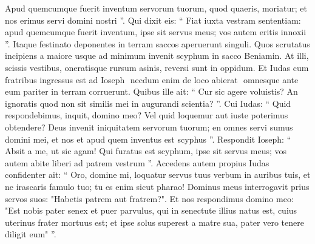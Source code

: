 \begin{biblechapter}
\begin{biblechapter}
\begin{biblechapter}
\begin{biblechapter}
\begin{biblechapter}
\begin{biblechapter}
\begin{biblechapter}
\begin{biblechapter}
\begin{biblechapter}
\begin{biblechapter}
\begin{biblechapter}
\begin{biblechapter}
\begin{biblechapter}
\begin{biblechapter}
\begin{biblechapter}
\begin{biblechapter}
\begin{biblechapter}
\begin{biblechapter}
\begin{biblechapter}
\begin{biblechapter}
\begin{biblechapter}
\begin{biblechapter}
\begin{biblechapter}
\begin{biblechapter}
\begin{biblechapter}
\begin{biblechapter}
\begin{biblechapter}
\begin{biblechapter}
\begin{biblechapter}
\begin{biblechapter}
\begin{biblechapter}
\begin{biblechapter}
\begin{biblechapter}
\begin{biblechapter}
\begin{biblechapter}
\begin{biblechapter}
\begin{biblechapter}
\begin{biblechapter}
\begin{biblechapter}
\begin{biblechapter}
\begin{biblechapter}
\begin{biblechapter}
\begin{biblechapter}
\begin{biblechapter}
\verse Apud quemcumque fuerit inventum servorum tuorum, quod quaeris, moriatur; et nos erimus servi domini nostri ”.
 \verse Qui dixit eis: “ Fiat iuxta vestram sententiam: apud quemcumque fuerit inventum, ipse sit servus meus; vos autem eritis innoxii ”. 
\verse Itaque festinato deponentes in terram saccos aperuerunt singuli. 
\verse Quos scrutatus incipiens a maiore usque ad minimum invenit scyphum in sacco Beniamin.
 \verse At illi, scissis vestibus, oneratisque rursum asinis, reversi sunt in oppidum. 
\verse Et Iudas cum fratribus ingressus est ad Ioseph ­ necdum enim de loco abierat ­ omnesque ante eum pariter in terram corruerunt. 
\verse Quibus ille ait: “ Cur sic agere voluistis? An ignoratis quod non sit similis mei in augurandi scientia? ”. 
\verse Cui Iudas: “ Quid respondebimus, inquit, domino meo? Vel quid loquemur aut iuste poterimus obtendere? Deus invenit iniquitatem servorum tuorum; en omnes servi sumus domini mei, et nos et apud quem inventus est scyphus ”. 
\verse Respondit Ioseph: “ Absit a me, ut sic agam! Qui furatus est scyphum, ipse sit servus meus; vos autem abite liberi ad patrem vestrum ”.
 \verse Accedens autem propius Iudas confidenter ait: “ Oro, domine mi, loquatur servus tuus verbum in auribus tuis, et ne irascaris famulo tuo; tu es enim sicut pharao! 
\verse Dominus meus interrogavit prius servos suos: "Habetis patrem aut fratrem?". 
\verse Et nos respondimus domino meo: "Est nobis pater senex et puer parvulus, qui in senectute illius natus est, cuius uterinus frater mortuus est; et ipse solus superest a matre sua, pater vero tenere diligit eum" ”. 

\end{biblechapter}
\end{biblechapter}
\end{biblechapter}
\end{biblechapter}
\end{biblechapter}
\end{biblechapter}
\end{biblechapter}
\end{biblechapter}
\end{biblechapter}
\end{biblechapter}
\end{biblechapter}
\end{biblechapter}
\end{biblechapter}
\end{biblechapter}
\end{biblechapter}
\end{biblechapter}
\end{biblechapter}
\end{biblechapter}
\end{biblechapter}
\end{biblechapter}
\end{biblechapter}
\end{biblechapter}
\end{biblechapter}
\end{biblechapter}
\end{biblechapter}
\end{biblechapter}
\end{biblechapter}
\end{biblechapter}
\end{biblechapter}
\end{biblechapter}
\end{biblechapter}
\end{biblechapter}
\end{biblechapter}
\end{biblechapter}
\end{biblechapter}
\end{biblechapter}
\end{biblechapter}
\end{biblechapter}
\end{biblechapter}
\end{biblechapter}
\end{biblechapter}
\end{biblechapter}
\end{biblechapter}
\end{biblechapter}
